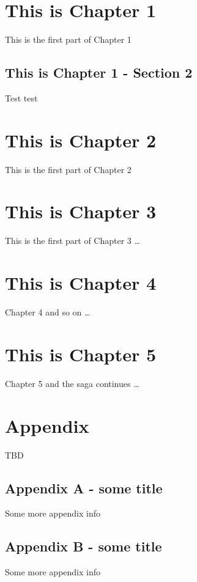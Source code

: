 \chapter{This is Chapter 1}\label{this-is-chapter-1}

This is the first part of Chapter 1

\section{This is Chapter 1 - Section
2}\label{this-is-chapter-1---section-2}

Test test

\chapter{This is Chapter 2}\label{this-is-chapter-2}

This is the first part of Chapter 2

\chapter{This is Chapter 3}\label{this-is-chapter-3}

This is the first part of Chapter 3 \ldots{}

\chapter{This is Chapter 4}\label{this-is-chapter-4}

Chapter 4 and so on \ldots{}

\chapter{This is Chapter 5}\label{this-is-chapter-5}

Chapter 5 and the saga continues \ldots{}

\chapter*{Appendix}\label{appendix}

TBD

\section{Appendix A - some title}\label{appendix-a---some-title}

Some more appendix info

\section{Appendix B - some title}\label{appendix-b---some-title}

Some more appendix info
